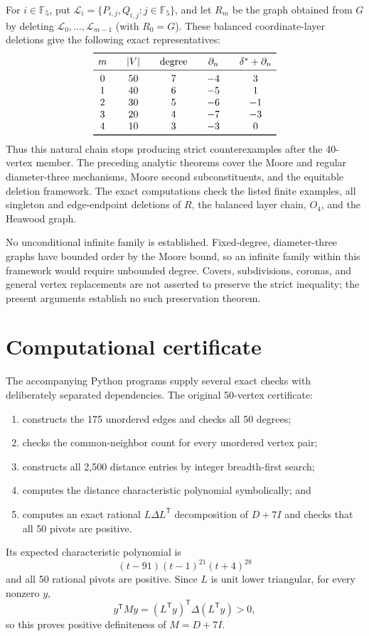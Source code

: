 \documentclass[a4paper,11pt,reqno]{amsart}
\theoremstyle{plain}
\theoremstyle{definition}
\theoremstyle{remark}
\begin{document}
For \(i\in\mathbb F_5\), put
\(\mathcal L_i=\{P_{i,j},Q_{i,j}:j\in\mathbb F_5\}\), and let \(R_m\) be
the graph obtained from \(G\) by deleting
\(\mathcal L_0,\ldots,\mathcal L_{m-1}\) (with \(R_0=G\)).  These balanced
coordinate-layer deletions give the following exact representatives:
\[
\begin{array}{c@{\qquad}c@{\qquad}c@{\qquad}c@{\qquad}c}
\toprule
m&|V|&\text{degree}&\partial_n&\delta^*+\partial_n\\
\midrule
0&50&7&-4&3\\
1&40&6&-5&1\\
2&30&5&-6&-1\\
3&20&4&-7&-3\\
4&10&3&-3&0\\
\bottomrule
\end{array}
\]
Thus this natural chain stops producing strict counterexamples after the
40-vertex member.  The preceding analytic theorems cover the Moore and
regular diameter-three mechanisms, Moore second subconstituents, and the
equitable deletion framework.  The exact computations check the listed
finite examples, all singleton and edge-endpoint deletions of \(R\), the
balanced layer chain, \(O_4\), and the Heawood graph.

No unconditional infinite family is established.  Fixed-degree,
diameter-three graphs have bounded order by the Moore bound, so an infinite
family within this framework would require unbounded degree.  Covers,
subdivisions, coronas, and general vertex replacements are not asserted to
preserve the strict inequality; the present arguments establish no such
preservation theorem.

\section{Computational certificate}

The accompanying Python programs supply several exact checks with deliberately
separated dependencies.  The original 50-vertex certificate:
\begin{enumerate}
\item constructs the 175 unordered edges and checks all 50 degrees;
\item checks the common-neighbor count for every unordered vertex pair;
\item constructs all 2,500 distance entries by integer breadth-first search;
\item computes the distance characteristic polynomial symbolically; and
\item computes an exact rational \(L\Delta L^{\mathsf T}\) decomposition of
      \(D+7I\) and checks that all 50 pivots are positive.
\end{enumerate}
Its expected characteristic polynomial is
\[
  (t-91)(t-1)^{21}(t+4)^{28}
\]
and all 50 rational pivots are positive.  Since \(L\) is unit lower
triangular, for every nonzero \(y\),
\[
 y^{\mathsf T}My=(L^{\mathsf T}y)^{\mathsf T}
 \Delta(L^{\mathsf T}y)>0,
\]
so this proves positive definiteness of \(M=D+7I\).
\end{document}
